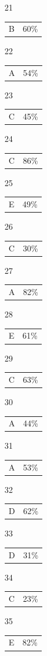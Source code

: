 \documentclass[12pt]{article}
\begin{document}
\begin{multicols}{5}
\begin{enumerate}
\item[21] \begin{tabular}{cc} B & 60\%\end{tabular}
\item[22] \begin{tabular}{cc} A & 54\%\end{tabular}
\item[23] \begin{tabular}{cc} C & 45\%\end{tabular}
\item[24] \begin{tabular}{cc} C & 86\%\end{tabular}
\item[25] \begin{tabular}{cc} E & 49\%\end{tabular}
\item[]
\item[26] \begin{tabular}{cc} C & 30\%\end{tabular}
\item[27] \begin{tabular}{cc} A & 82\%\end{tabular}
\item[28] \begin{tabular}{cc} E & 61\%\end{tabular}
\item[29] \begin{tabular}{cc} C & 63\%\end{tabular}
\item[30] \begin{tabular}{cc} A & 44\%\end{tabular}
\item[]
\item[31] \begin{tabular}{cc} A & 53\%\end{tabular}
\item[32] \begin{tabular}{cc} D & 62\%\end{tabular}
\item[33] \begin{tabular}{cc} D & 31\%\end{tabular}
\item[34] \begin{tabular}{cc} C & 23\%\end{tabular}
\item[35] \begin{tabular}{cc} E & 82\%\end{tabular}

\end{enumerate}
\end{multicols}
\end{document}
